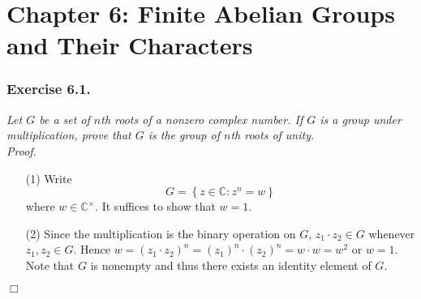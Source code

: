 \documentclass{article}
\begin{document}









\newpage
\section*{Chapter 6: Finite Abelian Groups and Their Characters \\}






\subsubsection*{Exercise 6.1.}
\emph{Let $G$ be a set of $n$th roots of a nonzero complex number.
If $G$ is a group under multiplication,
prove that $G$ is the group of $n$th roots of unity.} \\



\emph{Proof.}
\begin{enumerate}
\item[(1)]
  Write
  \[
    G = \left\{ z \in \mathbb{C} : z^n = w \right\}
  \]
  where $w \in \mathbb{C}^{\times}$.
  It suffices to show that $w = 1$.

\item[(2)]
  Since the multiplication is the binary operation on $G$,
  $z_1 \cdot z_2 \in G$ whenever $z_1, z_2 \in G$.
  Hence $w = (z_1 \cdot z_2)^n = (z_1)^n \cdot (z_2)^n = w \cdot w= w^2$ or $w = 1$.
  Note that $G$ is nonempty and thus there exists an identity element of $G$.
\end{enumerate}
$\Box$ \\\\



\end{document}
